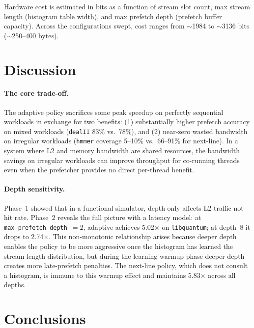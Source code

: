 \documentclass[11pt,letterpaper]{article}
\begin{document}
Hardware cost is estimated in bits as a function of stream slot count, max
stream length (histogram table width), and max prefetch depth (prefetch buffer
capacity). Across the configurations swept, cost ranges from $\sim$1984 to
$\sim$3136 bits ($\sim$250--400 bytes). 
\section{Discussion}

\paragraph{The core trade-off.}
The adaptive policy sacrifices some peak speedup on perfectly sequential
workloads in exchange for two benefits: (1) substantially higher prefetch
accuracy on mixed workloads (\texttt{dealII} 83\% vs.\ 78\%), and (2) near-zero
wasted bandwidth on irregular workloads (\texttt{hmmer} coverage 5--10\% vs.\
66--91\% for next-line). In a system where L2 and memory bandwidth are shared
resources, the bandwidth savings on irregular workloads can improve throughput
for co-running threads even when the prefetcher provides no direct per-thread
benefit.

\paragraph{Depth sensitivity.}
Phase~1 showed that in a functional simulator, depth only affects L2 traffic
not hit rate. Phase~2 reveals the full picture with a latency model: at
\texttt{max\_prefetch\_depth}~$= 2$, adaptive achieves 5.02$\times$ on
\texttt{libquantum}; at depth~8 it drops to 2.74$\times$. This non-monotonic
relationship arises because deeper depth enables the policy to be more
aggressive once the histogram has learned the stream length distribution, but
during the learning warmup phase deeper depth creates more late-prefetch
penalties. The next-line policy, which does not consult a histogram, is immune
to this warmup effect and maintains 5.83$\times$ across all depths.

\section{Conclusions}
\end{document}
